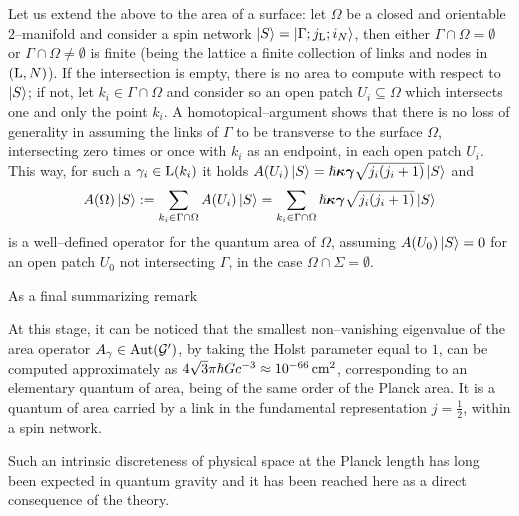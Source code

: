 Let us extend the above to the area of a surface: let $\Omega$ be a closed and orientable $2$--manifold and consider a spin network $\left| S \right >=\left| \Gamma;j_{\text{\normalfont L}};i_N \right >$, then either $\Gamma\cap\Omega=\emptyset$ or $\Gamma\cap\Omega\neq\emptyset$ is finite (being the lattice a finite collection of links and nodes in $(\text{\normalfont L},N)$). If the intersection is empty, there is no area to compute with respect to $\left| S \right >$; if not, let $k_i\in\Gamma\cap\Omega$ and consider so an open patch $U_i\subseteq\Omega$ which intersects one and only the point $k_i$. A homotopical--argument shows that there is no loss of generality in assuming the links of $\Gamma$ to be transverse to the surface $\Omega$, intersecting zero times or once with $k_i$ as an endpoint, in each open patch $U_i$. This way, for such a $\gamma_i\in\text{\normalfont L}(k_i)$ it holds $A(U_i)\left| S \right >=\hslash\boldsymbol{\kappa}\boldsymbol{\gamma}\sqrt{j_i(j_i+1)}\left| S \right >$ and
$$A(\Omega)\left| S \right >:=\sum_{k_i\in\Gamma\cap\Omega}A(U_i)\left| S \right >=\sum_{k_i\in\Gamma\cap\Omega}\hslash\boldsymbol{\kappa}\boldsymbol{\gamma}\sqrt{j_i(j_i+1)}\left| S \right >$$
is a well--defined operator for the quantum area of $\Omega$, assuming $A(U_0)\left| S \right >=0$ for an open patch $U_0$ not intersecting $\Gamma$, in the case $\Omega\cap\Sigma=\emptyset$.



{As a final summarizing remark
\begin{remark}
    At this stage, it can be noticed that the smallest non--vanishing eigenvalue of the area operator $A_\gamma\in\text{\normalfont Aut}(\mathcal{G}')$, by taking the Holst parameter equal to $1$, can be computed approximately as $4\sqrt{3}\pi\hslash Gc^{-3}\approx10^{-66}\,\text{\normalfont{cm}}^2$, corresponding to an elementary quantum of area, being of the same order of the Planck area. It is a quantum of area carried by a link in the fundamental representation $j=\frac{1}{2}$, within a spin network.
\end{remark}
}
{Such an intrinsic discreteness of physical space at the Planck length has long been expected in quantum gravity and it has been reached here as a direct consequence of the theory.}


